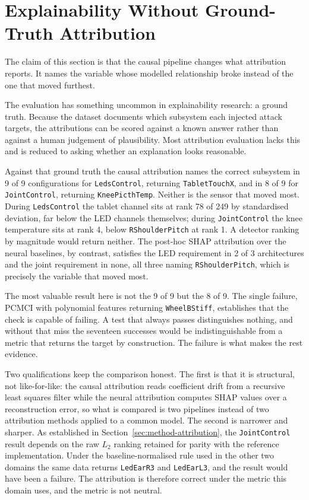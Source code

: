 \section{Explainability Without Ground-Truth Attribution}
\label{sec:disc-xai}

The claim of this section is that the causal pipeline changes what attribution reports. It names the variable whose modelled relationship broke instead of the one that moved furthest.

The evaluation has something uncommon in explainability research: a ground truth. Because the dataset documents which subsystem each injected attack targets, the attributions can be scored against a known answer rather than against a human judgement of plausibility. Most attribution evaluation lacks this and is reduced to asking whether an explanation looks reasonable.

Against that ground truth the causal attribution names the correct subsystem in 9 of 9 configurations for \texttt{LedsControl}, returning \texttt{TabletTouchX}, and in 8 of 9 for \texttt{JointControl}, returning \texttt{KneePicthTemp}. Neither is the sensor that moved most. During \texttt{LedsControl} the tablet channel sits at rank 78 of 249 by standardised deviation, far below the LED channels themselves; during \texttt{JointControl} the knee temperature sits at rank 4, below \texttt{RShoulderPitch} at rank 1. A detector ranking by magnitude would return neither. The post-hoc SHAP attribution over the neural baselines, by contrast, satisfies the LED requirement in 2 of 3 architectures and the joint requirement in none, all three naming \texttt{RShoulderPitch}, which is precisely the variable that moved most.

The most valuable result here is not the 9 of 9 but the 8 of 9. The single failure, PCMCI with polynomial features returning \texttt{WheelBStiff}, establishes that the check is capable of failing. A test that always passes distinguishes nothing, and without that miss the seventeen successes would be indistinguishable from a metric that returns the target by construction. The failure is what makes the rest evidence.

Two qualifications keep the comparison honest. The first is that it is structural, not like-for-like: the causal attribution reads coefficient drift from a recursive least squares filter while the neural attribution computes SHAP values over a reconstruction error, so what is compared is two pipelines instead of two attribution methods applied to a common model. The second is narrower and sharper. As established in Section~\ref{sec:method-attribution}, the \texttt{JointControl} result depends on the raw $L_2$ ranking retained for parity with the reference implementation. Under the baseline-normalised rule used in the other two domains the same data returns \texttt{LedEarR3} and \texttt{LedEarL3}, and the result would have been a failure. The attribution is therefore correct under the metric this domain uses, and the metric is not neutral.

